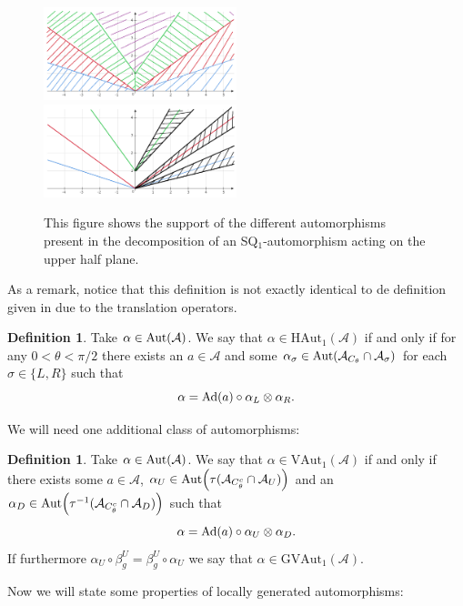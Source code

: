\documentclass[12pt,a4paper,twoside]{article}
\let\originalleft\left
\let\originalright\right
\renewcommand{\left}{\mathopen{}\mathclose\bgroup\originalleft}
\renewcommand{\right}{\aftergroup\egroup\originalright}
\renewcommand{\AA}{\mathcal A}
\newcommand{\Ad}[1]{\textrm{Ad}\left(#1\right)}
\newcommand{\Aut}[1]{\textrm{Aut}\left(#1\right)}
\theoremstyle{definition}
\newtheorem{definition}[theorem]{Definition}
\numberwithin{equation}{section}
\begin{document}
\begin{figure}
	\includegraphics[width=0.5\textwidth]{Figures/AlphaFirstDecomposition.png}
	\includegraphics[width=0.5\textwidth]{Figures/AlphaSecondDecomposition.png}
	\caption{This figure shows the support of the different automorphisms present in the decomposition of an SQ$_1$-automorphism acting on the upper half plane.}
	\label{fig:SetupSQAut}
\end{figure}
As a remark, notice that this definition is not exactly identical to de definition given in \cite{ogata2021h3gmathbb} due to the translation operators.
\begin{definition}
	Take $\alpha\in\Aut{\AA}$. We say that $\alpha\in\textrm{HAut}_1(\AA)$ if and only if for any $0<\theta<\pi/2$ there exists an $a\in\AA$ and some $\alpha_\sigma\in\Aut{\AA_{C_\theta}\cap\AA_\sigma}$ for each $\sigma\in\{L,R\}$ such that
	\begin{equation}
		\alpha=\Ad{a}\circ\alpha_L\otimes\alpha_R.
	\end{equation}
\end{definition}
We will need one additional class of automorphisms:
\begin{definition}
	Take $\alpha\in\Aut{\AA}$. We say that $\alpha\in\textrm{VAut}_1(\AA)$ if and only if there exists some $a\in\AA$, $\alpha_U\in\Aut{\tau(\AA_{C_\theta^c}\cap\AA_{U})}$ and an $\alpha_D\in\Aut{\tau^{-1}(\AA_{C_\theta^c}\cap\AA_{D})}$ such that
	\begin{equation}
		\alpha=\Ad{a}\circ\alpha_U\otimes\alpha_D.
	\end{equation}
	If furthermore $\alpha_U\circ\beta_g^U=\beta_g^U\circ\alpha_U$ we say that $\alpha\in\textrm{GVAut}_1(\AA)$.
\end{definition}
Now we will state some properties of locally generated automorphisms:
\end{document}
